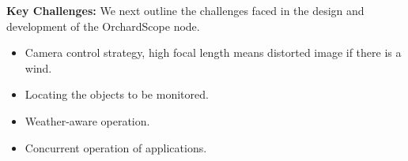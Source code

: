 




\noindent
\textbf{Key Challenges:} We next outline the challenges faced in the design and development of the OrchardScope node. 
\begin{itemize}
    \item Camera control strategy, high focal length means distorted image if there is a wind. 
    \item Locating the objects to be monitored. 
    \item Weather-aware operation. 
    \item Concurrent operation of applications. 
\end{itemize}

